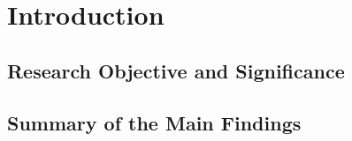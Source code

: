 \chapter{Introduction}\label{ch:Introduction}



\section{Research Objective and Significance}\label{sec:Research_Objective_and_Significance}



\section{Summary of the Main Findings}\label{sec:Summary_of_the_Main_Findings}